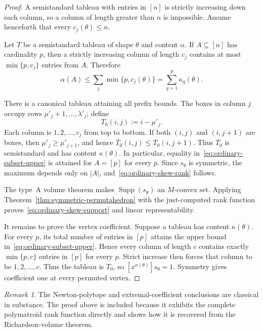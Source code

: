 \documentclass[11pt,a4paper,oneside]{amsart}
\numberwithin{equation}{section}
\theoremstyle{definition}
\theoremstyle{remark}
\newtheorem{remark}[theorem]{Remark}
\DeclareMathOperator{\Supp}{Supp}
\begin{document}
\begin{proof}
A semistandard tableau with entries in $[n]$ is strictly increasing down each
column, so a column of length greater than $n$ is impossible.  Assume henceforth
that every $c_j(\theta)\leq n$.

Let $T$ be a semistandard tableau of shape $\theta$ and content $\alpha$.  If
$A\subseteq[n]$ has cardinality $p$, then a strictly increasing column of
length $c_j$ contains at most $\min\{p,c_j\}$ entries from $A$.  Therefore
\begin{equation}\label{eq:ordinary-subset-upper}
 \alpha(A)\leq\sum_j\min\{p,c_j(\theta)\}
 =\sum_{q=1}^{p}\kappa_q(\theta).
\end{equation}

There is a canonical tableau attaining all prefix bounds.  The boxes in column
$j$ occupy rows $\mu'_j+1,\ldots,\lambda'_j$; define
\begin{equation}\label{eq:ordinary-canonical-tableau}
 T_0(i,j):=i-\mu'_j.
\end{equation}
Each column is $1,2,\ldots,c_j$ from top to bottom.  If both $(i,j)$ and
$(i,j+1)$ are boxes, then $\mu'_j\geq\mu'_{j+1}$, and hence
$T_0(i,j)\leq T_0(i,j+1)$.  Thus $T_0$ is semistandard and has content
$\kappa(\theta)$.  In particular, equality in~\eqref{eq:ordinary-subset-upper}
is attained for $A=[p]$ for every $p$.  Since $s_\theta$ is symmetric, the
maximum depends only on $|A|$, and~\eqref{eq:ordinary-skew-rank} follows.

The type~A volume theorem makes $\Supp(s_\theta)$ an $M$-convex set.  Applying
Theorem~\ref{thm:symmetric-permutahedron} with the just-computed rank function
proves~\eqref{eq:ordinary-skew-support} and linear representability.

It remains to prove the vertex coefficient.  Suppose a tableau has content
$\kappa(\theta)$.  For every $p$, its total number of entries in $[p]$ attains
the upper bound in~\eqref{eq:ordinary-subset-upper}.  Hence every column of
length $c$ contains exactly $\min\{p,c\}$ entries in $[p]$ for every $p$.
Strict increase then forces that column to be $1,2,\ldots,c$.  Thus the tableau
is $T_0$, so $[x^{\kappa(\theta)}]s_\theta=1$.  Symmetry gives coefficient one
at every permuted vertex.
\end{proof}

\begin{remark}
The Newton-polytope and extremal-coefficient conclusions are classical in
substance.  The proof above is included because it exhibits the complete
polymatroid rank function directly and shows how it is recovered from the
Richardson-volume theorem.
\end{remark}
\end{document}
